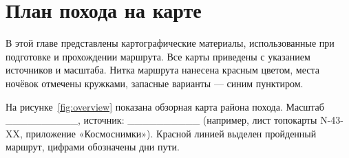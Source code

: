 \chapter{План похода на карте}
\label{ch:planmap}

В этой главе представлены картографические материалы, использованные при подготовке и прохождении маршрута. Все карты приведены с указанием источников и масштаба. Нитка маршрута нанесена красным цветом, места ночёвок отмечены кружками, запасные варианты — синим пунктиром.

На рисунке~\ref{fig:overview} показана обзорная карта района похода. Масштаб \_\_\_\_\_\_\_\_\_\_, источник: \_\_\_\_\_\_\_\_\_\_ (например, лист топокарты N-43-XX, приложение «Космоснимки»). Красной линией выделен пройденный маршрут, цифрами обозначены дни пути.

